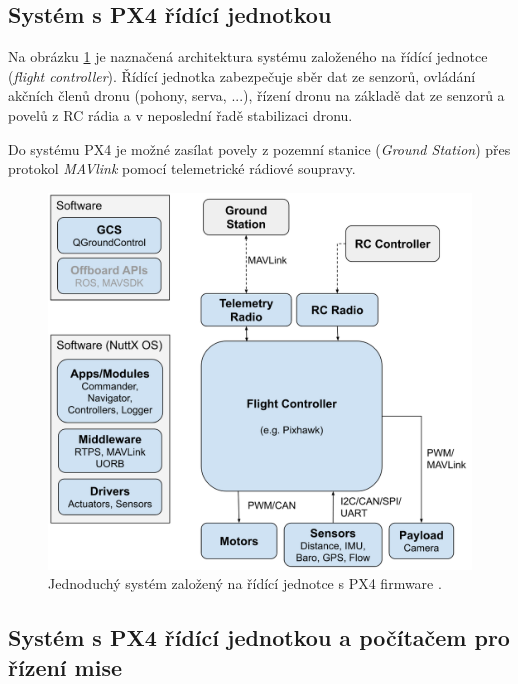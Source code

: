 \subsection{Systém s PX4 řídící jednotkou}

Na obrázku \ref{fig:PX4_FC} je naznačená architektura systému založeného na řídící jednotce (\textit{flight controller}). Řídící jednotka zabezpečuje sběr dat ze senzorů, ovládání akčních členů dronu (pohony, serva, ...), řízení dronu na základě dat ze senzorů a povelů z RC rádia a v neposlední řadě stabilizaci dronu.

Do systému PX4 je možné zasílat povely z pozemní stanice (\textit{Ground Station}) přes protokol \textit{MAVlink} pomocí telemetrické rádiové soupravy.

\begin{figure}[!ht]
    \begin{center}
        \includegraphics[scale=0.36]{obrazky/PX42}
    \end{center}
    \caption[Jednoduchý systém založený na řídící jednotce s PX4 firmware]{Jednoduchý systém založený na řídící jednotce s PX4 firmware \cite{PX4docs}.}
    \label{fig:PX4_FC}
\end{figure}

\subsection{Systém s PX4 řídící jednotkou a počítačem pro řízení mise}

